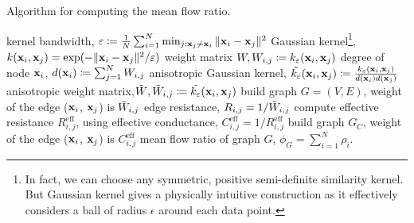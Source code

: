 \setcounter{algocf}{2}
\begin{algorithm}[H]
\caption{Algorithm for computing the mean flow ratio.}\label{alg:mean-flow-ratio}
\DontPrintSemicolon
{}
kernel bandwidth, $\varepsilon \coloneqq \frac{1}{N}\sum_{i=1}^N \min_{j: \mathbf{x}_j \neq \mathbf{x}_i}\|\mathbf{x}_i - \mathbf{x}_j\|^2$\;
Gaussian kernel\footnote{In fact, we can choose any symmetric, positive semi-definite similarity kernel. But Gaussian kernel gives a physically intuitive construction as it effectively considers a ball of radius $\epsilon$ around each data point.}, $k(\mathbf{x}_i, \mathbf{x}_j) = \exp(-\|\mathbf{x}_i - \mathbf{x}_j\|^2/\varepsilon)$ \;
weight matrix $W, W_{i, j}\coloneqq {k_\varepsilon}(\mathbf{x}_i, \mathbf{x}_j)$\;
degree of node $\mathbf{x}_i$, $d(\mathbf{x}_i) \coloneqq \sum_{j=1}^N W_{i,j}$\;
anisotropic Gaussian kernel, $\Tilde{k_\varepsilon}(\mathbf{x}_i, \mathbf{x}_j) \coloneqq \frac{k_\varepsilon(\mathbf{x}_i, \mathbf{x}_j)}{d(\mathbf{x}_i)d(\mathbf{x}_j)}$ \;
anisotropic weight matrix,$\Tilde{W}, \Tilde{W}_{i, j}\coloneqq \Tilde{k_\varepsilon}(\mathbf{x}_i, \mathbf{x}_j)$\;
build graph $G = (V, E)$, weight of the edge ($\mathbf{x}_i$, $\mathbf{x}_j$) is $\Tilde{W}_{i, j}$ \;
edge resistance, $R_{i, j} = 1/\Tilde{W}_{i, j}$ \;
compute effective resistance $R^{\text{eff}}_{i, j}$, using \cite{effective-resistance}\;
effective conductance, $C^{\text{eff}}_{i, j} = 1/R^{\text{eff}}_{i, j}$\;
build graph $G_C$, weight of the edge ($\mathbf{x}_i$, $\mathbf{x}_j$) is $C^{\text{eff}}_{i, j}$  \;
mean flow ratio of graph $G$, $\phi_G = \sum_{i=1}^N \rho_i.$
\end{algorithm}
